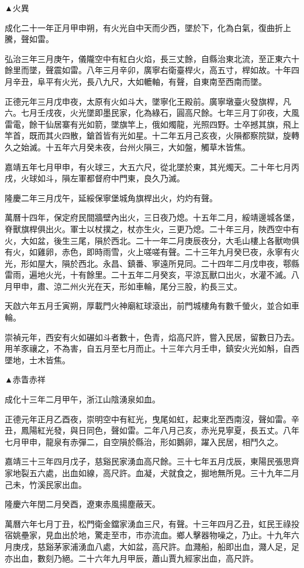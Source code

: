 \begin{pinyinscope}
▲火異

成化二十一年正月甲申朔，有火光自中天而少西，墜於下，化為白氣，復曲折上騰，聲如雷。

弘治三年三月庚午，儀隴空中有紅白火焰，長三丈餘，自縣治東北流，至正東六十餘里而墜，聲震如雷。八年三月辛卯，廣寧右衛臺桿火，高五寸，桿如故。十年四月辛丑，阜平有火光，長八九尺，大如轆軸，有聲，自東南至西南而墜。

正德元年三月戊申夜，太原有火如斗大，墜寧化王殿前。廣寧墩臺火發旗桿，凡六。七月壬戌夜，火光墜即墨民家，化為綠石，圓高尺餘。七年三月丁卯夜，大風雷電，餘干仙居寨有光如箭，墜旗竿上，俄如燭龍，光照四野。士卒撼其旗，飛上竿首，既而其火四散，鎗首皆有光如星。十二年五月己亥夜，火隕都察院獄，旋轉久之始滅。十五年六月癸未夜，台州火隕三，大如盤，觸草木皆焦。

嘉靖五年七月甲申，有火球三，大五六尺，從北墜於東，其光燭天。二十年七月丙戌，火球如斗，隕左軍都督府中門東，良久乃滅。

隆慶二年三月戊午，延綏保寧堡城角旗桿出火，灼灼有聲。

萬曆十四年，保定府民間牆壁內出火，三日夜乃熄。十五年二月，綏靖邊城各堡，脊獸旗桿俱出火。軍士以杖撲之，杖亦生火，三更乃熄。二十年三月，陜西空中有火，大如盆，後生三尾，隕於西北。二十一年二月庚辰夜分，大毛山樓上各獸吻俱有火，如雞卵，赤色，即時雨雪，火上嗟嗟有聲。二十三年九月癸巳夜，永寧有火光，形如屋大，隕於西北。永昌、鎮番、寧遠所見同。二十四年二月戊申夜，鄠縣雷雨，遍地火光，十有餘里。二十五年二月癸亥，平涼瓦獸口出火，水灌不滅。八月甲申，肅、涼二州火光在天，形如車輪，尾分三股，約長三丈。

天啟六年五月壬寅朔，厚載門火神廟紅球滾出，前門城樓角有數千螢火，並合如車輪。

崇禎元年，西安有火如碾如斗者數十，色青，焰高尺許，嘗入民居，留數日乃去。用羊豕禳之，不為害，自五月至七月而止。十三年六月壬申，鎮安火光如斛，自西墜地，士木皆焦。

▲赤眚赤祥

成化十三年二月甲午，浙江山陰湧泉如血。

正德元年正月乙酉夜，崇明空中有紅光，曳尾如虹，起東北至西南沒，聲如雷。辛丑，鳳陽紅光發，與日同色，聲如雷。二年八月己亥，赤光見寧夏，長五丈。八年七月甲申，龍泉有赤彈二，自空隕於縣治，形如鵝卵，躍入民居，相鬥久之。

嘉靖三十三年四月戊子，慈谿民家湧血高尺餘。三十七年五月戊辰，東陽民張思齊家地裂五六處，出血如線，高尺許。血凝，犬就食之，掘地無所見。三十九年二月己未，竹溪民家出血。

隆慶六年閏二月癸酉，遼東赤風揚塵蔽天。

萬曆六年七月丁丑，松門衛金鐺家湧血三尺，有聲。十三年四月乙丑，虹民王祿投宿姚壘家，見血出於地，驚走至市，市亦流血。鄉人擊器物噪之，乃止。十九年六月庚戌，慈谿茅家浦湧血八處，大如盆，高尺許。血濺船，船即出血，濺人足，足亦出血，數刻乃絕。二十六年九月甲辰，蕭山賈九經家出血，高尺許。


\end{pinyinscope}
